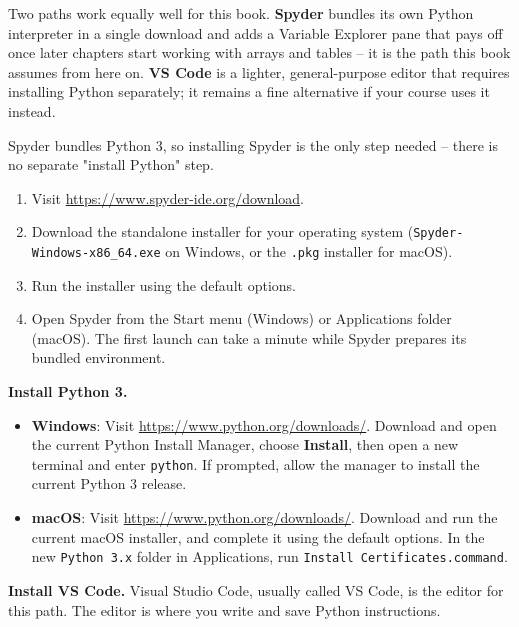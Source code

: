 
Two paths work equally well for this book. \textbf{Spyder} bundles its own
Python interpreter in a single download and adds a Variable Explorer pane
that pays off once later chapters start working with arrays and tables -- it
is the path this book assumes from here on. \textbf{VS Code} is a lighter,
general-purpose editor that requires installing Python separately; it remains
a fine alternative if your course uses it instead.


Spyder bundles Python 3, so installing Spyder is the only step needed --
there is no separate "install Python" step.

\begin{enumerate}
    \item Visit \url{https://www.spyder-ide.org/download}.
    \item Download the standalone installer for your operating system
          (\texttt{Spyder-Windows-x86\_64.exe} on Windows, or the
          \texttt{.pkg} installer for macOS).
    \item Run the installer using the default options.
    \item Open Spyder from the Start menu (Windows) or Applications folder
          (macOS). The first launch can take a minute while Spyder prepares
          its bundled environment.
\end{enumerate}


\textbf{Install Python 3.}
\begin{itemize}
    \item \textbf{Windows}: Visit \url{https://www.python.org/downloads/}.
          Download and open the current Python Install Manager, choose
          \textbf{Install}, then open a new terminal and enter
          \texttt{python}. If prompted, allow the manager to install the
          current Python 3 release.
    \item \textbf{macOS}: Visit \url{https://www.python.org/downloads/}.
          Download and run the current macOS installer, and complete it using
          the default options. In the new \texttt{Python 3.x} folder in
          Applications, run \texttt{Install Certificates.command}.
\end{itemize}

\textbf{Install VS Code.} Visual Studio Code, usually called VS Code, is the
editor for this path. The editor is where you write and save Python
instructions.

